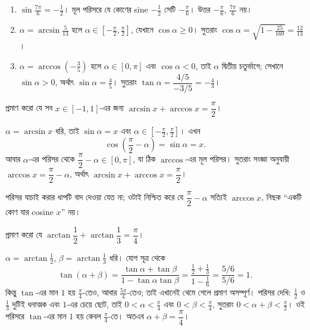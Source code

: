 \documentclass[11pt]{article}
\begin{document}
\begin{sol}
\begin{enumerate}
  \item $\sin\tfrac{7\pi}{6} = -\tfrac{1}{2}$। মূল পরিসরে যে কোণের sine
        $-\tfrac{1}{2}$ সেটি $-\tfrac{\pi}{6}$। উত্তর $-\tfrac{\pi}{6}$,
        $\tfrac{7\pi}{6}$ নয়।
  \item $\alpha = \arcsin\tfrac{5}{13}$ হলে $\alpha \in
        \left[ -\tfrac{\pi}{2}, \tfrac{\pi}{2} \right]$, যেখানে
        $\cos\alpha \geq 0$। সুতরাং
        $\cos\alpha = \sqrt{1 - \tfrac{25}{169}} = \tfrac{12}{13}$।
  \item $\alpha = \arccos\left( -\tfrac{3}{5} \right)$ হলে $\alpha \in
        [0,\pi]$ এবং $\cos\alpha < 0$, তাই $\alpha$ দ্বিতীয় চতুর্ভাগে; সেখানে
        $\sin\alpha > 0$, অর্থাৎ $\sin\alpha = \tfrac{4}{5}$। সুতরাং
        $\tan\alpha = \dfrac{4/5}{-3/5} = -\tfrac{4}{3}$।
\end{enumerate}
\end{sol}

 প্রমাণ করো যে সব $x \in [-1,1]$-এর জন্য
$\arcsin x + \arccos x = \dfrac{\pi}{2}$।

\begin{sol}
$\alpha = \arcsin x$ ধরি, তাই $\sin\alpha = x$ এবং
$\alpha \in \left[ -\tfrac{\pi}{2}, \tfrac{\pi}{2} \right]$। এখন
\[
  \cos\left( \frac{\pi}{2} - \alpha \right) = \sin\alpha = x .
\]
আবার $\alpha$-এর পরিসর থেকে $\dfrac{\pi}{2} - \alpha \in [0, \pi]$, যা ঠিক
$\arccos$-এর মূল পরিসর। সুতরাং সংজ্ঞা অনুযায়ী
$\arccos x = \dfrac{\pi}{2} - \alpha$, অর্থাৎ
$\arcsin x + \arccos x = \dfrac{\pi}{2}$।

পরিসর যাচাই করার ধাপটি বাদ দেওয়া যেত না; ওটাই নিশ্চিত করে যে
$\dfrac{\pi}{2}-\alpha$ সত্যিই $\arccos x$, নিছক ``একটি কোণ যার cosine $x$'' নয়।
\end{sol}

 প্রমাণ করো যে
$\arctan\dfrac{1}{2} + \arctan\dfrac{1}{3} = \dfrac{\pi}{4}$।

\begin{sol}
$\alpha = \arctan\tfrac{1}{2}$, $\beta = \arctan\tfrac{1}{3}$ ধরি। যোগ সূত্র
থেকে
\[
  \tan(\alpha+\beta) = \frac{\tan\alpha + \tan\beta}{1 - \tan\alpha\tan\beta}
  = \frac{\tfrac{1}{2} + \tfrac{1}{3}}{1 - \tfrac{1}{6}}
  = \frac{5/6}{5/6} = 1 .
\]
কিন্তু $\tan$-এর মান $1$ হয় $\tfrac{\pi}{4}$-তেও, আবার
$\tfrac{5\pi}{4}$-তেও; তাই এখানেই থেমে গেলে প্রমাণ অসম্পূর্ণ। পরিসর দেখি:
$\tfrac{1}{2}$ ও $\tfrac{1}{3}$ দুটিই ধনাত্মক এবং $1$-এর চেয়ে ছোট, তাই
$0 < \alpha < \tfrac{\pi}{4}$ এবং $0 < \beta < \tfrac{\pi}{4}$, সুতরাং
$0 < \alpha+\beta < \tfrac{\pi}{2}$। ওই পরিসরে $\tan$-এর মান $1$ হয় কেবল
$\tfrac{\pi}{4}$-তে। অতএব $\alpha + \beta = \dfrac{\pi}{4}$।
\end{sol}
\end{document}
